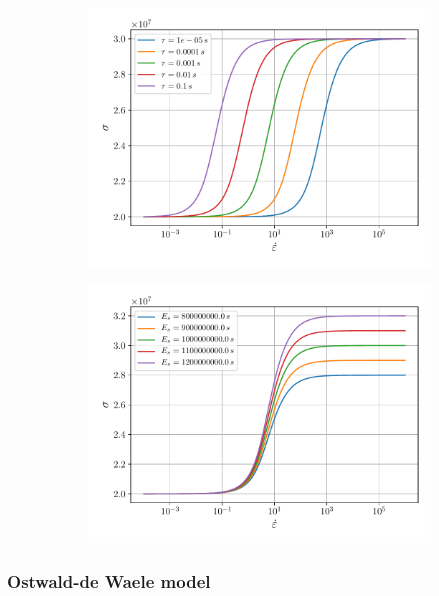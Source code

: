 \documentclass[12pt]{article}
\begin{document}
\begin{figure}
	\begin{subfigure}{0.48\textwidth}
		\centering
		\includegraphics[width=\linewidth]{e-dot-stress-tau}
	\end{subfigure}
	\begin{subfigure}{0.48\textwidth}
		\centering
		\includegraphics[width=\linewidth]{e-dot-stress-E}
	\end{subfigure}

\end{figure}

\subsubsection{Ostwald-de Waele model}
\end{document}
